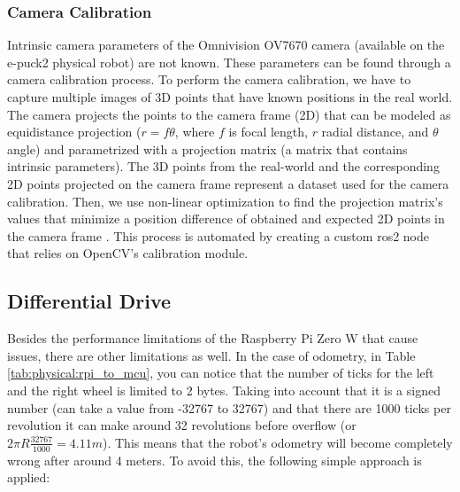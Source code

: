 \subsubsection{Camera Calibration}
Intrinsic camera parameters of the Omnivision OV7670 camera (available on the e-puck2 physical robot) are not known.
These parameters can be found through a camera calibration process.
To perform the camera calibration, we have to capture multiple images of 3D points that have known positions in the real world.
The camera projects the points to the camera frame (2D) that can be modeled as equidistance projection ($r = f\theta$, where $f$ is focal length, $r$ radial distance, and $\theta$ angle) and parametrized with a projection matrix (a matrix that contains intrinsic parameters).
The 3D points from the real-world and the corresponding 2D points projected on the camera frame represent a dataset used for the camera calibration.
Then, we use non-linear optimization to find the projection matrix's values that minimize a position difference of obtained and expected 2D points in the camera frame \cite{lukic_dual_nodate}. 
This process is automated by creating a custom \ac{ros2} node that relies on OpenCV's calibration module.

\subsection{Differential Drive}
Besides the performance limitations of the Raspberry Pi Zero W that cause issues, there are other limitations as well. In the case of odometry, in Table \ref{tab:physical:rpi_to_mcu}, you can notice that the number of ticks for the left and the right wheel is limited to 2 bytes. Taking into account that it is a signed number (can take a value from -32767 to 32767) and that there are 1000 ticks per revolution it can make around 32 revolutions before overflow (or $ 2 \pi R \frac{32767}{1000} = 4.11m $). This means that the robot's odometry will become completely wrong after around 4 meters. To avoid this, the following simple approach is applied:

